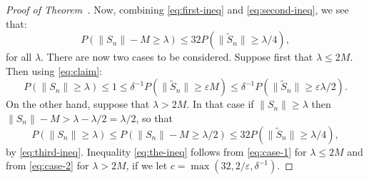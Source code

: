 \documentclass[12pt]{amsart}
\def\e{\varepsilon}
\def\upref#1{\upn{\ref{#1}}}
\theoremstyle{definition}
\theoremstyle{plain}
\theoremstyle{remark}
\begin{document}
\begin{proof}[Proof of Theorem~\upref{th:main}]
Now, combining \eqref{eq:first-ineq} and \eqref{eq:second-ineq}, we see
that:
\begin{equation}\label{eq:third-ineq}
   P(\|S_n\|-M\ge\lambda)\le 32 P(\|\tilde S_n\|\ge\lambda/4),
\end{equation}
for all $\lambda$.
There are now two cases to be considered.  Suppose first
that $\lambda\le 2M$.  Then using \eqref{eq:claim}:
\begin{equation}\label{eq:case-1}
  P(\|S_n\|\ge\lambda)
   \le 1 \le \delta^{-1} P(\|\tilde S_n\|\ge \e M)
   \le \delta^{-1}P(\|\tilde S_n\|\ge \e\lambda/2).
\end{equation}
On the other hand, suppose that $\lambda> 2M$.  In that case
if $\|S_n\|\ge\lambda$ then $\|S_n\| -M> \lambda-\lambda/2=\lambda/2$, so
that
\begin{equation}\label{eq:case-2}
  P(\|S_n\|\ge\lambda)\le P(\|S_n\|-M\ge\lambda/2) \le 32 P(\|\tilde S_n\|\ge
   \lambda/4),
\end{equation}
by \eqref{eq:third-ineq}.  Inequality \eqref{eq:the-ineq} follows from
\eqref{eq:case-1} for $\lambda\le 2M$ and from \eqref{eq:case-2} for
$\lambda > 2M$, if we let $c=\max(32,2/\e,\delta^{-1})$.
\end{proof}
\end{document}

